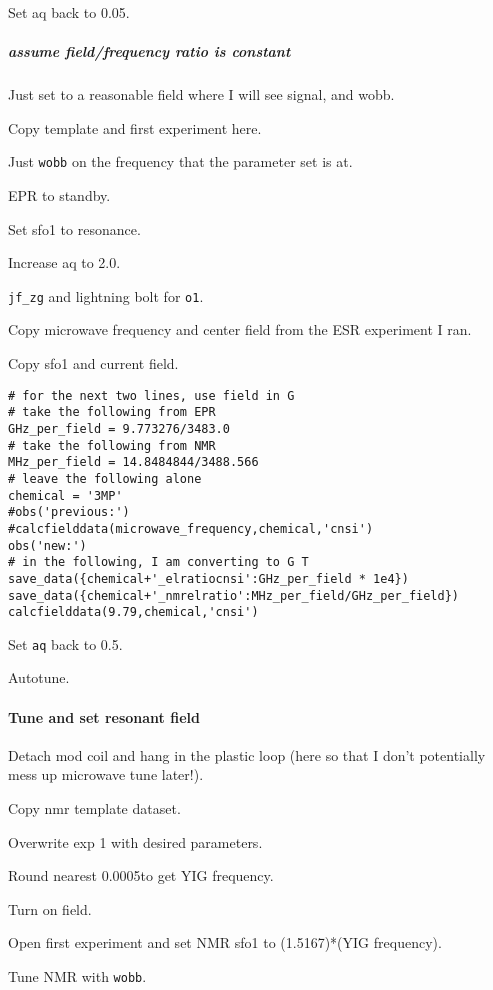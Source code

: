 Set aq back to 0.05.


\subparagraph{assume field/frequency ratio is constant}

Just set to a reasonable field where I will see signal, and wobb.

Copy template and first experiment here.

Just \texttt{wobb} on the frequency that the parameter set is at.

EPR to standby.

Set sfo1 to resonance.

Increase aq to 2.0.  

\texttt{jf\_zg} and lightning bolt for \texttt{o1}.  

Copy microwave frequency and center field from the ESR experiment I ran.

Copy sfo1 and current field.

\begin{lstlisting}
# for the next two lines, use field in G
# take the following from EPR
GHz_per_field = 9.773276/3483.0
# take the following from NMR
MHz_per_field = 14.8484844/3488.566
# leave the following alone
chemical = '3MP'
#obs('previous:')
#calcfielddata(microwave_frequency,chemical,'cnsi')
obs('new:')
# in the following, I am converting to G T
save_data({chemical+'_elratiocnsi':GHz_per_field * 1e4})
save_data({chemical+'_nmrelratio':MHz_per_field/GHz_per_field})
calcfielddata(9.79,chemical,'cnsi')
\end{lstlisting}

Set \texttt{aq} back to 0.5.

Autotune.
\paragraph{Tune and set resonant field}
Detach mod coil and hang in the plastic loop (here so that I don't potentially mess up microwave tune later!).

Copy nmr template dataset.

Overwrite exp 1 with desired parameters.

Round nearest 0.0005\GHz to get YIG frequency.

Turn on field.

Open first experiment and set NMR sfo1 to (1.5167)*(YIG frequency).

Tune NMR with {\tt wobb}.


